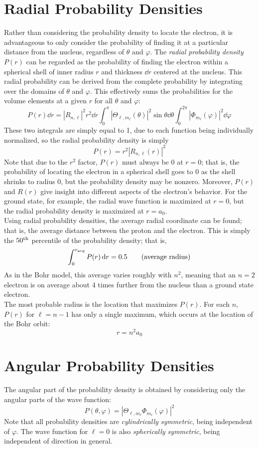 \documentclass{subfiles}
\begin{document}
	\section{Radial Probability Densities}
		Rather than considering the probability density to locate the electron, it is advantageous to only consider the probability of finding it at a particular distance from the nucleus, regardless of \(\theta\) and \(\varphi\). The \textit{radial probability density \(P(r)\)} can be regarded as the probability of finding the electron within a spherical shell of inner radius \(r\) and thickness \(\dd{r}\) centered at the nucleus. This radial probability can be derived from the complete probability by integrating over the domains of \(\theta\) and \(\varphi\). This effectively sums the probabilities for the volume elements at a given \(r\) for all \(\theta\) and \(\varphi\):
			\[P(r)\dd{r} = |R_{n, \ell}|^2r^2\dd{r}\int_0^\pi|\Theta_{\ell, m_\ell}(\theta)|^2\sin\theta\dd{\theta}\int_0^{2\pi}|\Phi_{m_\ell}(\varphi)|^2\dd{\varphi}\]
			These two integrals are simply equal to 1, due to each function being individually normalized, so the radial probability density is simply
			\[
				P(r) = r^2|R_{n, \ell}(r)|^2
					\tag{radial probability density}
			\]
			Note that due to the \(r^2\) factor, \(P(r)\) must always be 0 at \(r = 0\); that is, the probability of locating the electron in a spherical shell goes to 0 as the shell shrinks to radius 0, but the probability density may be nonzero. Moreover, \(P(r)\) and \(R(r)\) give insight into different aspects of the electron's behavior. For the ground state, for example, the radial wave function is maximized at \(r = 0\), but the radial probability density is maximized at \(r = a_0\). \\
		Using radial probability densities, the average radial coordinate can be found; that is, the average distance between the proton and the electron. This is simply the \(50^{\text{th}}\) percentile of the probability density; that is,
			\[
				\int_0^{r_{\text{avg}}}P(r)\dd{r} = 0.5
					\tag{average radius}
			\]
			As in the Bohr model, this average varies roughly with \(n^2\), meaning that an \(n = 2\) electron is on average about 4 times further from the nucleus than a ground state electron. \\
		The most probable radius is the location that maximizes \(P(r)\). For each \(n\), \(P(r)\) for \(\ell = n - 1\) has only a single maximum, which occurs at the location of the Bohr orbit:
			\[
				r = n^2a_0
					\tag{most probable radius}
			\]
	\section{Angular Probability Densities}
		The angular part of the probability density is obtained by considering only the angular parts of the wave function:
			\[
				P(\theta, \varphi) = |\Theta_{\ell, m_\ell}\Phi_{m_\ell}(\varphi)|^2
					\tag{angular probability density}
			\]
			Note that all probability densities are \textit{cylindrically symmetric}, being independent of \(\varphi\). The wave function for \(\ell = 0\) is also \textit{spherically symmetric}, being independent of direction in general. 
\end{document}

